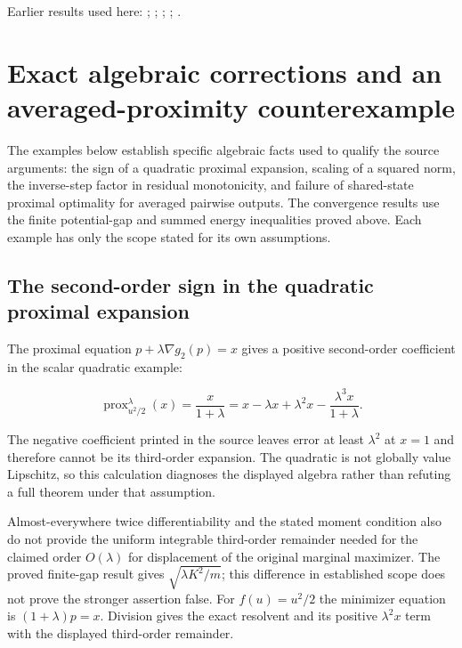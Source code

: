 \documentclass[11pt,a4paper]{report}
\begin{document}
Earlier results used here: \cite[Section~3.17.4]{LangevinLean2026ULASC}; \cite[Section~3.1.1]{LangevinLean2026IPLA}; \cite[Section~3.1.6]{LangevinLean2026IPLA}; \cite[Section~3.3.1]{LangevinLean2026IPLA}; \cite[Section~3.3.2]{LangevinLean2026IPLA}.
\section{\texorpdfstring{Exact algebraic corrections and an averaged-proximity counterexample}{Exact algebraic corrections and an averaged-proximity counterexample}}
\label{proof-module-ProximalLangevin-Corrections-lean}


The examples below establish specific algebraic facts used to qualify the source arguments: the sign of a quadratic proximal expansion, scaling of a squared norm, the inverse-step factor in residual monotonicity, and failure of shared-state proximal optimality for averaged pairwise outputs. The convergence results use the finite potential-gap and summed energy inequalities proved above. Each example has only the scope stated for its own assumptions.


\subsection{\texorpdfstring{The second-order sign in the quadratic proximal expansion}{The second-order sign in the quadratic proximal expansion}}
\label{report-step-ProximalLangevin-Corrections-lean-1}


The proximal equation \(p+\lambda\nabla g_2(p)=x\) gives a positive second-order coefficient in the scalar quadratic example:

\[
\operatorname{prox}_{u^2/2}^\lambda(x)
=\frac{x}{1+\lambda}
=x-\lambda x+\lambda^2x-\frac{\lambda^3x}{1+\lambda}.
\]

The negative coefficient printed in the source leaves error at least \(\lambda^2\) at \(x=1\) and therefore cannot be its third-order expansion. The quadratic is not globally value Lipschitz, so this calculation diagnoses the displayed algebra rather than refuting a full theorem under that assumption.



Almost-everywhere twice differentiability and the stated moment condition also do not provide the uniform integrable third-order remainder needed for the claimed order \(O(\lambda)\) for displacement of the original marginal maximizer. The proved finite-gap result gives \(\sqrt{\lambda K^2/m}\); this difference in established scope does not prove the stronger assertion false. For \(f(u)=u^2/2\) the minimizer equation is \((1+\lambda)p=x\). Division gives the exact resolvent and its positive \(\lambda^2x\) term with the displayed third-order remainder.
\end{document}
